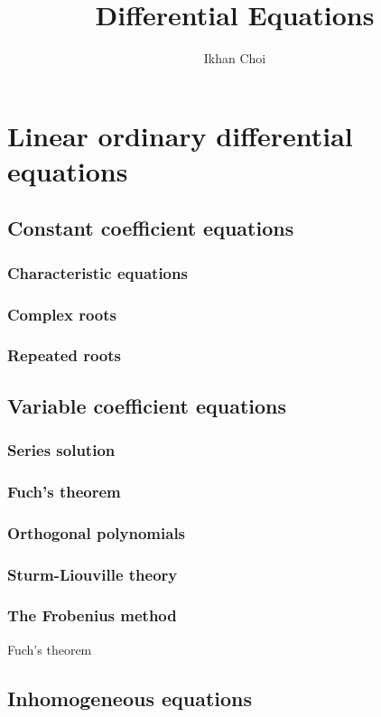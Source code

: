 \documentclass{../note}
\begin{document}
\title{Differential Equations}
\author{Ikhan Choi}
\maketitle
\tableofcontents

\part{Linear ordinary differential equations}
\chapter{Constant coefficient equations}
\section{Characteristic equations}
\section{Complex roots}
\section{Repeated roots}

\chapter{Variable coefficient equations}
\section{Series solution}
\section{Fuch's theorem}
\section{Orthogonal polynomials}
\section{Sturm-Liouville theory}
\section{The Frobenius method}
Fuch's theorem

\chapter{Inhomogeneous equations}
\end{document}
